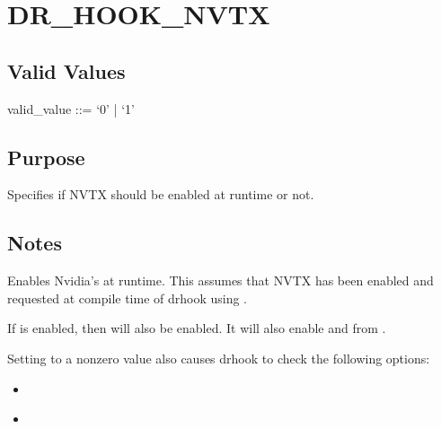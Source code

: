 \documentclass[letterpaper,10pt,english]{sphinxmanual}
\begin{document}
\section{DR\_HOOK\_NVTX}
\label{\detokenize{flag/flag:dr-hook-nvtx}}\label{\detokenize{flag/flag:id229}}

\subsection{Valid Values}
\label{\detokenize{flag/flag:id230}}
\begin{DUlineblock}{0em}
\item[] valid\_value ::= ‘0’ | ‘1’
\end{DUlineblock}


\subsection{Purpose}
\label{\detokenize{flag/flag:id231}}
\sphinxAtStartPar
Specifies if NVTX should be enabled at runtime or not.


\subsection{Notes}
\label{\detokenize{flag/flag:id232}}
\sphinxAtStartPar
Enables Nvidia’s  at runtime. This assumes that NVTX has been enabled and requested at compile time of drhook using .

\sphinxAtStartPar
If {\hyperref[\detokenize{flag/flag:dr-hook-nvtx}]{}} is enabled, then {\hyperref[\detokenize{flag/flag:dr-hook-strict-regions}]{}} will also be enabled. It will also enable  and  from {\hyperref[\detokenize{flag/flag:dr-hook-opt}]{}}.

\sphinxAtStartPar
Setting  to a non\sphinxhyphen{}zero value also causes drhook to check the following options:
\begin{itemize}
\item {} 
\sphinxAtStartPar
{\hyperref[\detokenize{flag/flag:dr-hook-nvtx-spam-call-count}]{}}

\item {} 
\sphinxAtStartPar
{\hyperref[\detokenize{flag/flag:dr-hook-nvtx-spam-wt}]{}}

\end{itemize}
\end{document}
